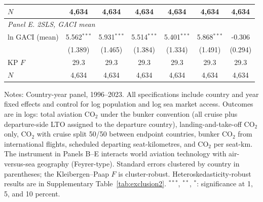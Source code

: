 \begin{table}[htbp]
\begin{threeparttable}
\begin{tabular}{lcccccc}
  $N$ & 4,634 & 4,634 & 4,634 & 4,634 & 4,634 & 4,634 \\
\midrule
\multicolumn{7}{l}{\textit{Panel E. 2SLS, GACI mean}} \\
  ln GACI (mean) & 5.562$^{***}$ & 5.931$^{***}$ & 5.514$^{***}$ & 5.401$^{***}$ & 5.868$^{***}$ & -0.306 \\
   & (1.389) & (1.465) & (1.384) & (1.334) & (1.491) & (0.294) \\
  KP $F$ & 29.3 & 29.3 & 29.3 & 29.3 & 29.3 & 29.3 \\
  $N$ & 4,634 & 4,634 & 4,634 & 4,634 & 4,634 & 4,634 \\
\bottomrule
\end{tabular}
\begin{tablenotes}[flushleft]
\footnotesize
\item Notes: Country-year panel, 1996--2023. All specifications include country and year fixed effects and control for log population and log sea market access. Outcomes are in logs: total aviation CO$_2$ under the bunker convention (all cruise plus departure-side LTO assigned to the departure country), landing-and-take-off CO$_2$ only, CO$_2$ with cruise split 50/50 between endpoint countries, bunker CO$_2$ from international flights, scheduled departing seat-kilometres, and CO$_2$ per seat-km. The instrument in Panels B--E interacts world aviation technology with air-versus-sea geography (Feyrer-type). Standard errors clustered by country in parentheses; the Kleibergen--Paap $F$ is cluster-robust. Heteroskedasticity-robust results are in Supplementary Table~\ref{tab:exclusion2}. $^{***}$, $^{**}$, $^{*}$: significance at 1, 5, and 10 percent.
\end{tablenotes}
\end{threeparttable}
\end{table}

